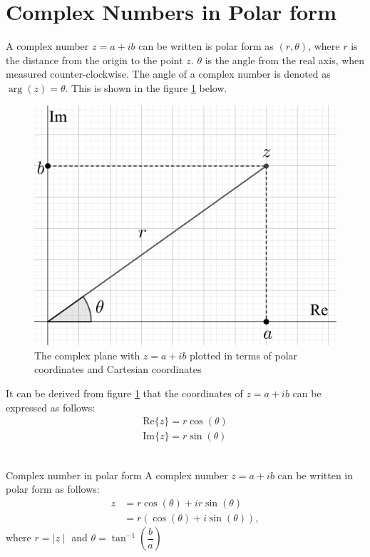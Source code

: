 \section{Complex Numbers in Polar form}
A complex number $z=a+ib$ can be written is polar form as $(r,\theta)$, where $r$ is the distance from the origin to the point $z$. $\theta$ is the angle from the real axis, when measured counter-clockwise. The angle of a complex number is denoted as $\arg(z)=\theta$. This is shown in the figure \ref{fig:complex_plane_polar} below.
\begin{figure}[H] 
\centering
\includegraphics[scale=0.15]{fig/img/complex_plan_polar}
\caption{The complex plane with $z=a+ib$ plotted in terms of polar coordinates and Cartesian coordinates}
\label{fig:complex_plane_polar}
\end{figure}
\noindent
It can be derived from figure \ref{fig:complex_plane_polar} that the coordinates of $z=a+ib$ can be expressed as follows:
\begin{align}
\text{Re}\{z\}=r\cos(\theta)
\\
\text{Im}\{z\}=r\sin(\theta)
\end{align}
\\
\begin{definition}{Complex number in polar form}{}
A complex number $z=a+ib$ can be written in polar form as follows:
\begin{align}
z&=r\cos(\theta)+ir\sin(\theta)
\\
&=r\left(\cos(\theta)+i\sin(\theta)\right),
\end{align}
where $r=\mid z \mid$ and $\theta=\tan^{-1}\left(\dfrac{b}{a} \right)$
\end{definition}
